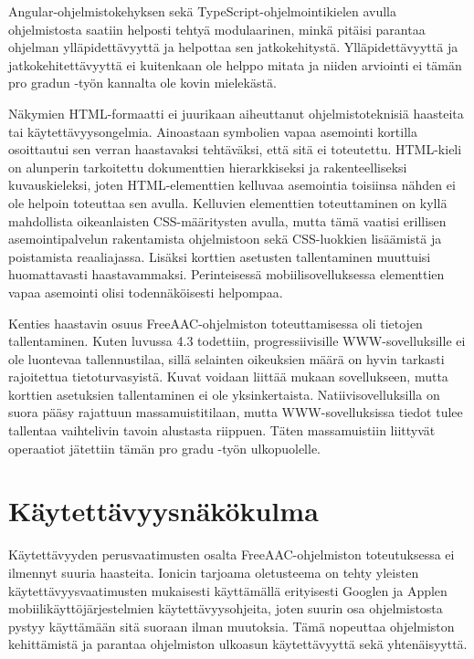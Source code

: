 \documentclass[utf8]{gradu3}
\begin{document}
Angular-ohjelmistokehyksen sekä TypeScript-ohjelmointikielen avulla ohjelmistosta saatiin helposti tehtyä modulaarinen, minkä pitäisi parantaa ohjelman ylläpidettävyyttä ja helpottaa sen jatkokehitystä. Ylläpidettävyyttä ja jatkokehitettävyyttä ei kuitenkaan ole helppo mitata ja niiden arviointi ei tämän pro gradun -työn kannalta ole kovin mielekästä.

Näkymien HTML-formaatti ei juurikaan aiheuttanut ohjelmistoteknisiä haasteita tai käytettävyysongelmia. Ainoastaan symbolien vapaa asemointi kortilla osoittautui sen verran haastavaksi tehtäväksi, että sitä ei toteutettu. HTML-kieli on alunperin tarkoitettu dokumenttien hierarkkiseksi ja rakenteelliseksi kuvauskieleksi, joten HTML-elementtien kelluvaa asemointia toisiinsa nähden ei ole helpoin toteuttaa sen avulla. Kelluvien elementtien toteuttaminen on kyllä mahdollista oikeanlaisten CSS-määritysten avulla, mutta tämä vaatisi erillisen asemointipalvelun rakentamista ohjelmistoon sekä CSS-luokkien lisäämistä ja poistamista reaaliajassa. Lisäksi korttien asetusten tallentaminen muuttuisi huomattavasti haastavammaksi. Perinteisessä mobiilisovelluksessa elementtien vapaa asemointi olisi todennäköisesti helpompaa.

Kenties haastavin osuus FreeAAC-ohjelmiston toteuttamisessa oli tietojen tallentaminen. Kuten luvussa 4.3 todettiin, progressiivisille WWW-sovelluksille ei ole luontevaa tallennustilaa, sillä selainten oikeuksien määrä on hyvin tarkasti rajoitettua tietoturvasyistä. Kuvat voidaan liittää mukaan sovellukseen, mutta korttien asetuksien tallentaminen ei ole yksinkertaista. Natiivisovelluksilla on suora pääsy rajattuun massamuistitilaan, mutta WWW-sovelluksissa tiedot tulee tallentaa vaihtelivin tavoin alustasta riippuen. Täten massamuistiin liittyvät operaatiot jätettiin tämän pro gradu -työn ulkopuolelle.

\section{Käytettävyysnäkökulma}

Käytettävyyden perusvaatimusten osalta FreeAAC-ohjelmiston toteutuksessa ei ilmennyt suuria haasteita. Ionicin tarjoama oletusteema on tehty yleisten käytettävyysvaatimusten mukaisesti käyttämällä erityisesti Googlen ja Applen mobiilikäyttöjärjestelmien käytettävyysohjeita, joten suurin osa ohjelmistosta pystyy käyttämään sitä suoraan ilman muutoksia. Tämä nopeuttaa ohjelmiston kehittämistä ja parantaa ohjelmiston ulkoasun käytettävyyttä sekä yhtenäisyyttä.
\end{document}
